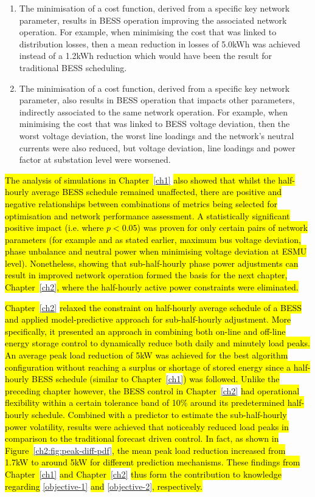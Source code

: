 \begin{enumerate}
	\item The minimisation of a cost function, derived from a specific key network parameter, results in BESS operation  improving the associated network operation. For example, when minimising the cost that was linked to distribution losses, then a mean reduction in losses of 5.0kWh was achieved instead of a 1.2kWh reduction which would have been the result for traditional BESS scheduling.
	\item The minimisation of a cost function, derived from a specific key network parameter, also results in BESS operation that impacts other parameters, indirectly associated to the same network operation. For example, when minimising the cost that was linked to BESS voltage deviation, then the worst voltage deviation, the worst line loadings and the network's neutral currents were also reduced, but voltage deviation, line loadings and power factor at substation level were worsened.
\end{enumerate}

\hl{The analysis of simulations in Chapter~}\ref{ch1}\hl{ also showed that whilst the half-hourly average BESS schedule remained unaffected, there are positive and negative relationships between combinations of metrics being selected for optimisation and network performance assessment.
A statistically significant positive impact (i.e. where $p<0.05$) was proven for only certain pairs of network parameters (for example and as stated earlier, maximum bus voltage deviation, phase unbalance and neutral power when minimising voltage deviation at ESMU level).
Nonetheless, showing that sub-half-hourly phase power adjustments can result in improved network operation formed the basis for the next chapter, Chapter~}\ref{ch2}\hl{, where the half-hourly active power constraints were eliminated.}

\hl{Chapter~}\ref{ch2}\hl{ relaxed the constraint on half-hourly average schedule of a BESS and applied model-predictive approach for sub-half-hourly adjustment.
More specifically, it presented an approach in combining both on-line and off-line energy storage control to dynamically reduce both daily and minutely load peaks.
An average peak load reduction of 5kW was achieved for the best algorithm configuration without reaching a surplus or shortage of stored energy since a half-hourly BESS schedule (similar to Chapter~}\ref{ch1}\hl{) was followed.
Unlike the preceding chapter however, the BESS control in Chapter~}\ref{ch2}\hl{ had operational flexibility within a certain tolerance band of 10\% around its predetermined half-hourly schedule.
Combined with a predictor to estimate the sub-half-hourly power volatility, results were achieved that noticeably reduced load peaks in comparison to the traditional forecast driven control.
In fact, as shown in Figure~}\ref{ch2:fig:peak-diff-pdf}\hl{, the mean peak load reduction increased from 1.7kW to around 5kW for different prediction mechanisms.
These findings from Chapter~}\ref{ch1}\hl{ and Chapter~}\ref{ch2}\hl{ thus form the contribution to knowledge regarding }\ref{objective-1}\hl{ and }\ref{objective-2}\hl{, respectively.}

